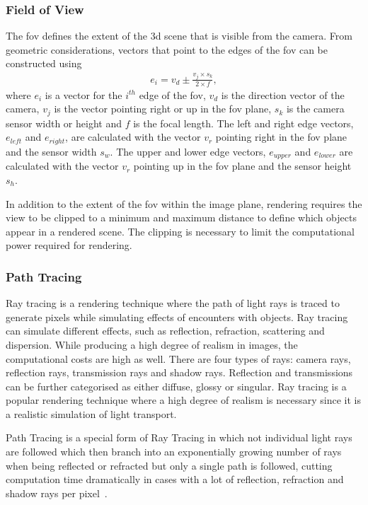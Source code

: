\subsubsection{Field of View}
The \gls{fov} defines the extent of the \gls{3d} scene that is visible from the camera. From geometric considerations, vectors that point to the edges of the \gls{fov} can be constructed using
\begin{align}
    e_{i} = v_d \pm \frac{v_j \times s_k}{2 \times f}, \label{eq:fov_edge}
\end{align}
where $e_{i}$ is a vector for the $i^{th}$ edge of the \gls{fov}, $v_d$ is the direction vector of the camera, $v_j$ is the vector pointing right or up in the \gls{fov} plane, $s_k$ is the camera sensor width or height and $f$ is the focal length. The left and right edge vectors, $e_{left}$ and $e_{right}$, are calculated with the vector $v_r$ pointing right in the \gls{fov} plane and the sensor width $s_w$. The upper and lower edge vectors, $e_{upper}$ and $e_{lower}$  are calculated with the vector $v_r$ pointing up in the \gls{fov} plane and the sensor height $s_h$.

In addition to the extent of the \gls{fov} within the image plane, rendering requires the view to be clipped to a minimum and maximum distance to define which objects appear in a rendered scene. The clipping is necessary to limit the computational power required for rendering. 

\subsubsection{Path Tracing}
Ray tracing is a rendering technique where the path of light rays is traced to generate pixels while simulating effects of encounters with objects. Ray tracing can simulate different effects, such as reflection, refraction, scattering and dispersion. While producing a high degree of realism in images, the computational costs are high as well. There are four types of rays: camera rays, reflection rays, transmission rays and shadow rays. Reflection and transmissions can be further categorised as either diffuse, glossy or singular. Ray tracing is a popular rendering technique where a high degree of realism is necessary since it is a realistic simulation of light transport.

Path Tracing is a special form of Ray Tracing in which not individual light rays are followed which then branch into an exponentially growing number of rays when being reflected or refracted but only a single path is followed, cutting computation time dramatically in cases with a lot of reflection, refraction and shadow rays per pixel~\cite{Kajiya1986TheEquation}.

